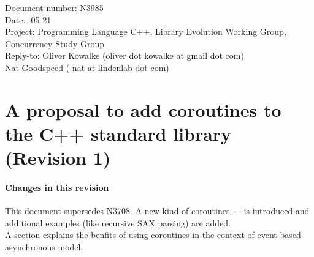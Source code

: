\documentclass[a4paper,10pt,DIV15]{scrartcl}
\begin{document}
\small
\begin{tabbing}
    Document number: \= N3985 \\
    Date:            -05-21 \\
    Project:         \> Programming Language C++, Library Evolution Working Group, Concurrency Study Group\\
    Reply-to:        \> Oliver Kowalke (oliver dot kowalke at gmail dot com)\\
                     \> Nat Goodspeed ( nat at lindenlab dot com)\\
\end{tabbing}

\section*{A proposal to add coroutines to the C++ standard library (Revision 1)}


\tableofcontents


\paragraph*{Changes in this revision}
This document supersedes N3708. A new kind of coroutines - \scoro - is introduced
and additional examples (like recursive SAX parsing) are added.\\
A section explains the benfits of using coroutines in the context of event-based
asynchronous model.













\end{document}
